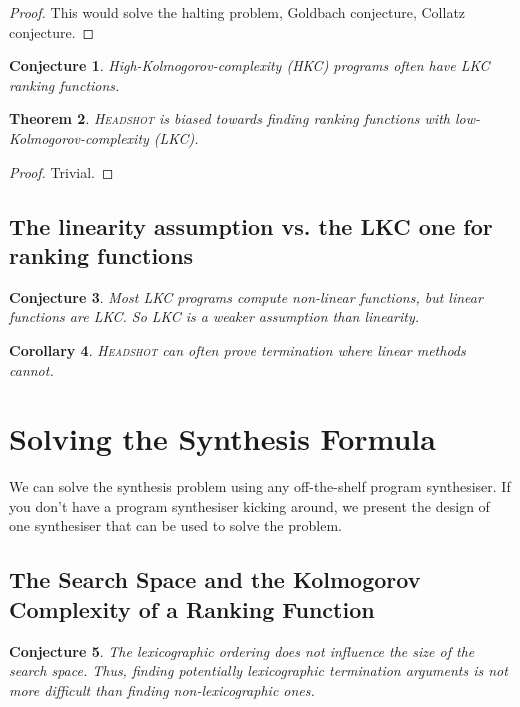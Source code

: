 \documentclass[preprint]{sigplanconf}
\newtheorem{theorem}{Theorem}
\newtheorem{corollary}[theorem]{Corollary}
\newtheorem{conjecture}[theorem]{Conjecture}
\theoremstyle{definition}
\begin{document}
\begin{proof}
 This would solve the halting problem, Goldbach conjecture, Collatz conjecture.
\end{proof}

\begin{conjecture}
 High-Kolmogorov-complexity (HKC) programs often have LKC ranking functions.
\end{conjecture}

\begin{theorem}
 \textsc{Headshot} is biased towards finding ranking functions with
 low-Kolmogorov-complexity (LKC).
\end{theorem}

\begin{proof}
 Trivial.
\end{proof}

\subsection{The linearity assumption vs. the LKC one for ranking functions}

\begin{conjecture}
 Most LKC programs compute non-linear functions, but linear functions are LKC.
 So LKC is a weaker assumption than linearity.
\end{conjecture}

\begin{corollary}
 \textsc{Headshot} can often prove termination where linear methods cannot.
\end{corollary}


\section{Solving the Synthesis Formula}
We can solve the synthesis problem using any off-the-shelf program synthesiser.  If you don't
have a program synthesiser kicking around, we present the design of one synthesiser
that can be used to solve the problem.

\subsection{The Search Space and the Kolmogorov Complexity of a Ranking Function}
\begin{conjecture}
The lexicographic ordering does not influence the size of the search space. Thus, finding potentially lexicographic termination arguments is not more difficult than finding non-lexicographic ones.   
\end{conjecture}
\end{document}
